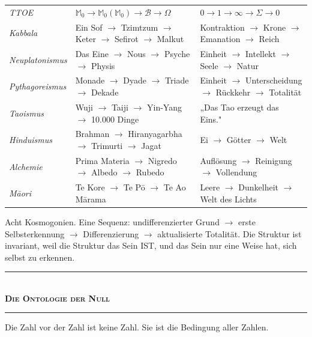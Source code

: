 \documentclass[10pt, openany, oneside]{book}
\renewcommand{\normalsize}{\fontsize{10}{13}\selectfont}
\renewcommand{\footnotesize}{\fontsize{8.5}{11}\selectfont}
\begin{document}
{\footnotesize
\noindent\begin{tabular}{l p{} p{}}
\textit{TTOE} & $\mathbb{M}_0 \to \mathbb{M}_0(\mathbb{M}_0) \to \mathcal{B} \to \Omega$ & $0 \to 1 \to \infty \to \Sigma \to 0$ \\[0.3em]
\textit{Kabbala} & Ein Sof $\to$ Tzimtzum $\to$ Keter $\to$ Sefirot $\to$ Malkut & Kontraktion $\to$ Krone $\to$ Emanation $\to$ Reich \\[0.3em]
\textit{Neuplatonismus} & Das Eine $\to$ Nous $\to$ Psyche $\to$ Physis & Einheit $\to$ Intellekt $\to$ Seele $\to$ Natur \\[0.3em]
\textit{Pythagoreismus} & Monade $\to$ Dyade $\to$ Triade $\to$ Dekade & Einheit $\to$ Unterscheidung $\to$ Rückkehr $\to$ Totalität \\[0.3em]
\textit{Taoismus} & Wuji $\to$ Taiji $\to$ Yin-Yang $\to$ 10.000 Dinge & „Das Tao erzeugt das Eins." \\[0.3em]
\textit{Hinduismus} & Brahman $\to$ Hiranyagarbha $\to$ Trimurti $\to$ Jagat & Ei $\to$ Götter $\to$ Welt \\[0.3em]
\textit{Alchemie} & Prima Materia $\to$ Nigredo $\to$ Albedo $\to$ Rubedo & Auflösung $\to$ Reinigung $\to$ Vollendung \\[0.3em]
\textit{M\={a}ori} & Te Kore $\to$ Te P\={o} $\to$ Te Ao M\={a}rama & Leere $\to$ Dunkelheit $\to$ Welt des Lichts \\[0.3em]
\end{tabular}
}

\vspace{0.5em}

\noindent Acht Kosmogonien. Eine Sequenz: undifferenzierter Grund $\to$ erste Selbsterkennung $\to$ Differenzierung $\to$ aktualisierte Totalität. Die Struktur ist invariant, weil die Struktur das Sein IST, und das Sein nur eine Weise hat, sich selbst zu erkennen.

\vspace{1em}

\begin{center}
    \rule{0.3\textwidth}{0.4pt}\\[0.5em]
    {\normalsize\bfseries\scshape Die Ontologie der Null}\\[0.3em]
    \rule{0.3\textwidth}{0.4pt}
\end{center}

\vspace{0.8em}

\noindent Die Zahl vor der Zahl ist keine Zahl. Sie ist die Bedingung aller Zahlen.
\end{document}
